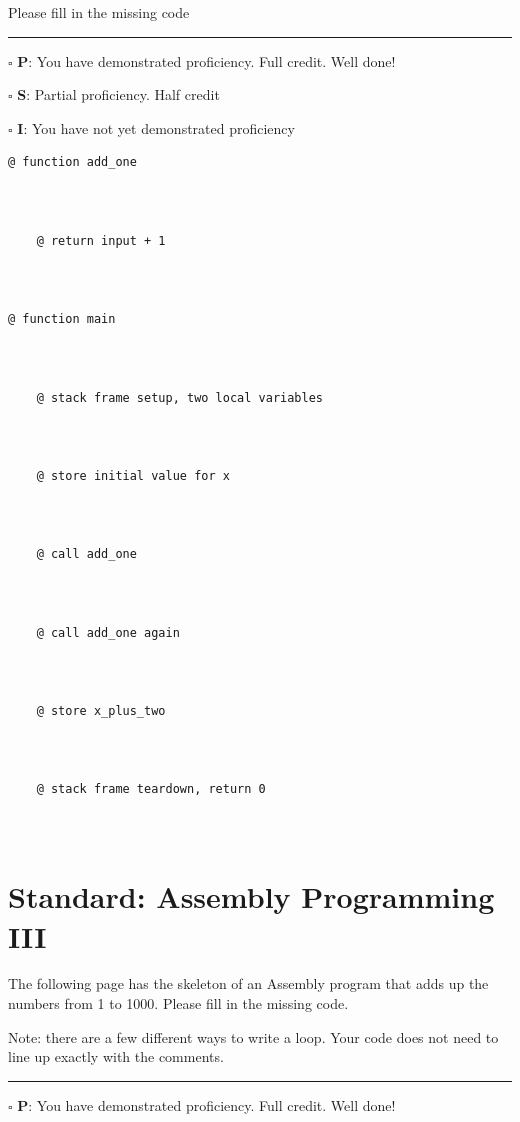 \documentclass[12pt]{article}
\begin{document}
Please fill in the missing code

\vfill

\rule[1ex]{\textwidth}{.1pt}

$\square$ \textbf{P}: You have demonstrated proficiency. Full credit. Well done!

$\square$ \textbf{S}: Partial proficiency. Half credit

$\square$ \textbf{I}: You have not yet demonstrated proficiency

\newpage

\begin{verbatim}
@ function add_one



    @ return input + 1



@ function main


    
    @ stack frame setup, two local variables



    @ store initial value for x



    @ call add_one



    @ call add_one again



    @ store x_plus_two



    @ stack frame teardown, return 0



\end{verbatim}

\section*{Standard: Assembly Programming III}



The following page has the skeleton of an Assembly program that adds up the numbers from 1 to 1000. Please fill in the missing code. 

Note: there are a few different ways to write a loop. Your code does not need to line up exactly with the comments.

\vfill

\rule[1ex]{\textwidth}{.1pt}

$\square$ \textbf{P}: You have demonstrated proficiency. Full credit. Well done!
\end{document}
